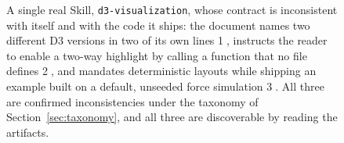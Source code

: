 \begin{figure}[t]

  \caption{A single real Skill, \texttt{d3-visualization}, whose contract is
    inconsistent with itself and with the code it ships: the document names two
    different D3 versions in two of its own lines \textcircled{1}, instructs the
    reader to enable a two-way highlight by calling a function that no file
    defines \textcircled{2}, and mandates deterministic layouts while shipping an
    example built on a default, unseeded force simulation \textcircled{3}.
    All three are confirmed inconsistencies under the taxonomy of
    Section~\ref{sec:taxonomy}, and all three are discoverable by reading the
    artifacts.}
  \label{fig:motivation}
\end{figure}
